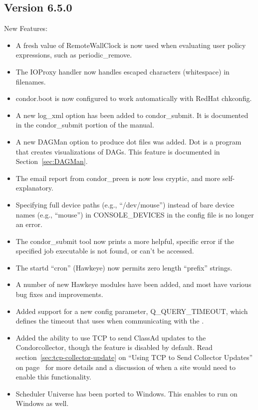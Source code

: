 \subsection{\label{sec:New-6-5-0}Version 6.5.0}
\noindent New Features:
\begin{itemize}

\item A fresh value of RemoteWallClock is now used when evaluating
user policy expressions, such as periodic\_remove.

\item The IOProxy handler now handles escaped characters (whitespace)
in filenames.

\item condor.boot is now configured to work automatically with RedHat
chkconfig.

\item A new log\_xml option has been added to condor\_submit. It is
documented in the condor\_submit portion of the manual.

\item A new DAGMan option to produce dot files was added. Dot is a
program that creates visualizations of DAGs. This feature is
documented in Section~\ref{sec:DAGMan}.

\item The email report from condor\_preen is now less cryptic, and
more self-explanatory.

\item Specifying full device paths (e.g., ``/dev/mouse'') instead of bare
device names (e.g., ``mouse'') in CONSOLE\_DEVICES in the config file is no
longer an error.

\item The condor\_submit tool now prints a more helpful, specific error if
the specified job executable is not found, or can't be accessed.

\item The startd ``cron'' (Hawkeye) now permits zero length ``prefix''
strings.

\item A number of new Hawkeye modules have been added, and most have
various bug fixes and improvements.

\item Added support for a new config parameter, Q\_QUERY\_TIMEOUT, which
defines the timeout that  uses when communicating with the
.

\item Added the ability to use TCP to send ClassAd updates to the
Condor{collector}, though the feature is disabled by default.
Read section~\ref{sec:tcp-collector-update} on ``Using TCP to Send
Collector Updates'' on page~\pageref{sec:tcp-collector-update} for
more details and a discussion of when a site would need to enable this 
functionality.

\item Scheduler Universe has been ported to Windows. This enables
 to run on Windows as well.

\end{itemize}

